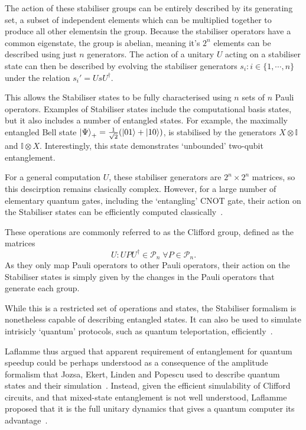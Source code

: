 \documentclass{standalone}
\begin{document}
\par
The action of these stabiliser groups can be entirely described by its generating set, a subset of independent elements which can be multiplied together to produce all other elementsin the group. Because the stabiliser operators have a common eigenstate, the group is abelian, meaning it's $2^{n}$ elements can be described using just $n$ generators. The action of a unitary $U$ acting on a stabiliser state can then be described by evolving the stabiliser generators $s_{i}:i\in\{1,\cdots, n\}$ under the relation $s_{i}' = UsU^{\dagger}$. 
\par
This allows the Stabiliser states to be fully characterised using $n$ sets of $n$ Pauli operators. Examples of Stabiliser states include the computational basis states, but it also includes a number of entangled states. For example, the maximally entangled Bell state $\ket{\Psi}_{+}=\frac{1}{\sqrt{2}}(\ket{01}+\ket{10})$, is stabilised by the generators $X\otimes \mathbb{I}$ and $\mathbb{I}\otimes X$. Interestingly, this state demonstrates `unbounded' two-qubit entanglement.
\par
For a general computation $U$, these stabiliser generators are $2^{n}\times2^{n}$ matrices, so this descirption remains clasically complex. However, for a large number of elementary quantum gates, including the `entangling' CNOT gate, their action on the Stabiliser states can be efficiently computed classically~\cite{Gottesman1999a}.
\par
These operations are commonly referred to as the Clifford group, defined as the matrices~\cite{Gottesman1999a}
\begin{equation}\label{eq:Clifford}
U:UPU^{\dagger}\in\mathcal{P}_{n}\;\forall P\in\mathcal{P}_{n}.
\end{equation}
As they only map Pauli operators to other Pauli operators, their action on the Stabiliser states is simply given by the changes in the Pauli operators that generate each group. 
\par
While this is a restricted set of operations and states, the Stabiliser formalism is nonetheless capable of describing entangled states. It can also be used to simulate intrisicly `quantum' protocols, such as quantum teleportation, efficiently~\cite{Aaronson2004a}.
\par
Laflamme thus argued that apparent requirement of entanglement for quantum speedup could be perhaps understood as a consequence of the amplitude formalism that Jozsa, Ekert, Linden and Popescu used to describe quantum states and their simulation~\cite{Laflamme2001}. Instead, given the efficient simulability of Clifford circuits, and that mixed-state entanglement is not well understood, Laflamme proposed that it is the full unitary dynamics that gives a quantum computer its advantage~\cite{Laflamme2001}.
\end{document}
